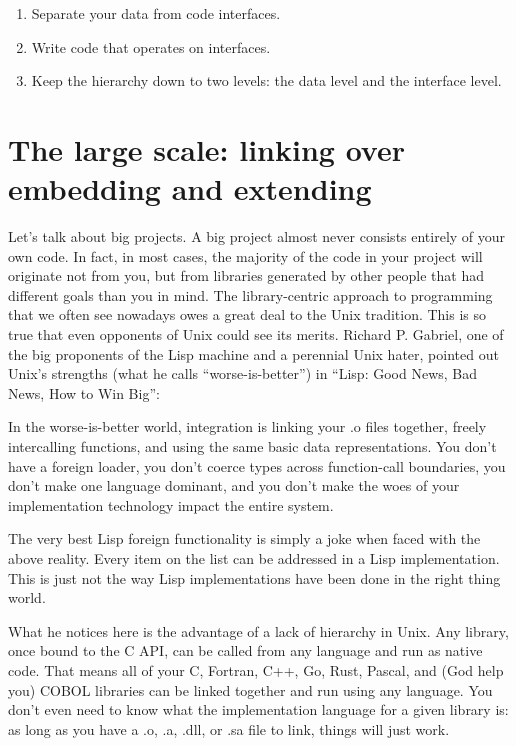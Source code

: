 \documentclass[12pt]{article}
\begin{document}
\begin{enumerate}
    \item Separate your data from code interfaces.
    \item Write code that operates on interfaces.
    \item Keep the hierarchy down to two levels: the data level and the interface level.
\end{enumerate}

\section{The large scale: linking over embedding and extending}

Let's talk about big projects. A big project almost never consists entirely of
your own code. In fact, in most cases, the majority of the code in your project
will originate not from you, but from libraries generated by other people that
had different goals than you in mind. The library-centric approach to
programming that we often see nowadays owes a great deal to the Unix tradition.
This is so true that even opponents of Unix could see its merits. Richard P.
Gabriel, one of the big proponents of the Lisp machine and a perennial Unix
hater, pointed out Unix's strengths (what he calls ``worse-is-better'') in
``Lisp: Good News, Bad News, How to Win Big'':

\begin{displayquote}
In the worse-is-better world, integration is linking your .o files together,
freely intercalling functions, and using the same basic data representations.
You don’t have a foreign loader, you don’t coerce types across function-call
boundaries, you don’t make one language dominant, and you don’t make the woes
of your implementation technology impact the entire system.

The very best Lisp foreign functionality is simply a joke when faced with the
above reality. Every item on the list can be addressed in a Lisp
implementation. This is just not the way Lisp implementations have been done in
the right thing world.
\end{displayquote}

What he notices here is the advantage of a lack of hierarchy in Unix. Any
library, once bound to the C API, can be called from any language and run as
native code. That means all of your C, Fortran, C++, Go, Rust, Pascal, and (God help
you) COBOL libraries can be linked together and run using any language.  You
don't even need to know what the implementation language for a given library
is: as long as you have a .o, .a, .dll, or .sa file to link, things will just work.
\end{document}
